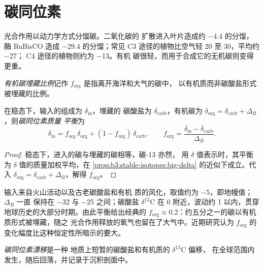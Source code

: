 \section{碳同位素}\label{sec:b3:stable-isotopes:carbon}

光合作用以动力学方式分馏碳。二氧化碳的
扩散进入叶片造成约 \qty{-4.4}{\permil} 的分馏，酶 RuBisCO 造成
\qty{-29.4}{\permil} 的分馏；常见 C3 途径的植物比空气轻 \num{20} 至
\qty{30}{\permil}，平均约 \qty{-27}{\permil}；
C4 途径的植物则约为 \qty{-13}{\permil}。有机
碳很轻，而用于合成它的无机碳则变得更重。

\begin{definition}[有机碳埋藏比例]\label{def:b3:stable-isotopes:forg}
\emph{有机碳埋藏比例}记作
$f_{\mathrm{org}}$ 是指离开海洋和大气的碳中，
以有机质而非碳酸盐形式被埋藏的比例。
\end{definition}

\begin{proposition}[碳同位素质量平衡]\label{prop:b3:stable-isotopes:forg}
在稳态下，输入的组成为 $\delta_{\mathrm{in}}$，埋藏的
碳酸盐为 $\delta_{\mathrm{carb}}$，有机碳为 $\delta_{\mathrm{org}} =
\delta_{\mathrm{carb}} + \Delta_B$，则\emph{碳同位素质量
平衡}为
\[
\delta_{\mathrm{in}} = f_{\mathrm{org}}\,\delta_{\mathrm{org}} + (1 - f_{\mathrm{org}})\,
\delta_{\mathrm{carb}}, \qquad f_{\mathrm{org}} = \frac{\delta_{\mathrm{in}} -
\delta_{\mathrm{carb}}}{\Delta_B}.
\]
\end{proposition}

\begin{proof}
稳态下，进入的碳与埋藏的碳相等，碳-13 亦然，
用 $\delta$ 值表示时，其平衡为
$\delta$ 值的质量加权平均，在
\cref{prop:b3:stable-isotopes:big-delta} 的近似下成立。代入 $\delta_{\mathrm{org}} =
\delta_{\mathrm{carb}} + \Delta_B$，解得 $f_{\mathrm{org}}$。
\end{proof}

输入来自火山活动以及古老碳酸盐和有机
质的风化，取值约为 \qty{-5}{\permil}，即地幔值；$\Delta_B$ 一直
保持在 $-32$ 与 \qty{-25}{\permil} 之间；碳酸盐
$\delta^{13}\mathrm C$ 在 0 附近，波动约 \qty{1}{\permil} 以内，贯穿
地球历史的大部分时期。由此平衡给出经典的 $f_{\mathrm{org}} \approx
0.2$：约五分之一的碳以有机质形式被埋藏，随之
光合作用释放的氧气也留在了大气中。近期研究认为
$f_{\mathrm{org}}$ 的变化幅度比这种恒定性所暗示的要大。

\begin{definition}[碳同位素漂移]\label{def:b3:stable-isotopes:cie}
\emph{碳同位素漂移}是一种
地质上短暂的碳酸盐和有机质的 $\delta^{13}\mathrm C$ 偏移，
在全球范围内发生，随后回落，并记录于沉积剖面中。
\end{definition}

